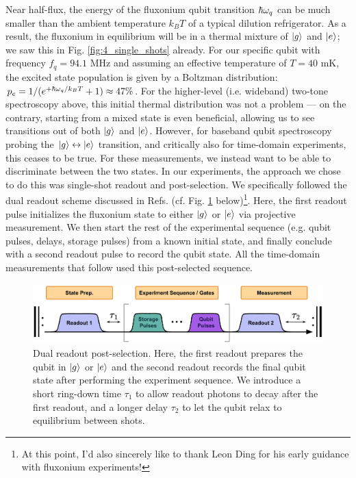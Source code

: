 Near half-flux, the energy of the fluxonium qubit transition $\hbar\omega_q$ can be much smaller than the ambient temperature $k_BT$ of a typical dilution refrigerator. As a result, the fluxonium in equilibrium will be in a thermal mixture of $\lvert g\rangle$ and $\lvert e\rangle$; we saw this in Fig. \ref{fig:4_single_shots} already. For our specific qubit with frequency $f_q = 94.1$ MHz and assuming an effective temperature of $T = 40$ mK, the excited state population is given by a Boltzman distribution: $p_e = 1 / (e^{+\hbar\omega_q/k_B T} + 1) \approx 47\%$. For the higher-level (i.e. wideband) two-tone spectroscopy above, this initial thermal distribution was not a problem --- on the contrary, starting from a mixed state is even beneficial, allowing us to see transitions out of both $\lvert g\rangle$ and $\lvert e\rangle$. However, for baseband qubit spectroscopy probing the $\lvert g\rangle\leftrightarrow\lvert e\rangle$ transition, and critically also for time-domain experiments, this ceases to be true. For these measurements, we instead want to be able to discriminate between the two states. In our experiments, the approach we chose to do this was single-shot readout and post-selection. We specifically followed the dual readout scheme discussed in Refs. \cite{ding2023FTF, ding2023thesis} (cf. Fig. \ref{fig:4_postselection} below)\footnote{At this point, I'd also sincerely like to thank Leon Ding for his early guidance with fluxonium experiments!}. Here, the first readout pulse initializes the fluxonium state to either $\lvert g\rangle$ or $\lvert e\rangle$ via projective measurement. We then start the rest of the experimental sequence (e.g. qubit pulses, delays, storage pulses) from a known initial state, and finally conclude with a second readout pulse to record the qubit state. All the time-domain measurements that follow used this post-selected sequence. 

\begin{figure}[h]
    \centering
    \includegraphics[width=0.9\linewidth]{Figures/4/postselection.pdf}
    \caption{Dual readout post-selection. Here, the first readout prepares the qubit in $\lvert g\rangle$ or $\lvert e\rangle$ and the second readout records the final qubit state after performing the experiment sequence. We introduce a short ring-down time $\tau_1$ to allow readout photons to decay after the first readout, and a longer delay $\tau_2$ to let the qubit relax to equilibrium between shots.}
    \label{fig:4_postselection}
\end{figure}

